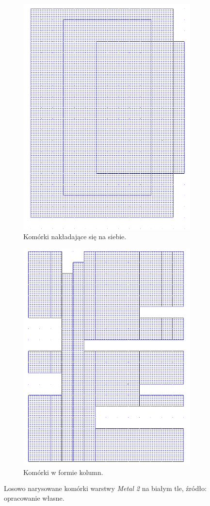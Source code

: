 \begin{figure}[h]
    \centering
    \begin{subfigure}{.45\textwidth}
        \centering
        \includegraphics[width=.5\linewidth]{chapters/chapter2/img/microwind_nadpisanie}
        \caption{Komórki nakładające się na siebie.}
        \label{fig:microwind_nadpisanie}
    \end{subfigure}
    \begin{subfigure}{.45\textwidth}
        \centering
        \includegraphics[width=.5\linewidth]{chapters/chapter2/img/microwind_kolumny}
        \caption{Komórki w formie kolumn.}
        \label{fig:microwind_kolumny}
    \end{subfigure}
    \caption[Losowo narysowane komórki warstwy \textit{Metal 2} na białym tle.]
    {
        Losowo narysowane komórki warstwy \textit{Metal 2} na białym tle,
        źródło: opracowanie własne.
    }
    \label{fig:microwind_biale}
\end{figure}

